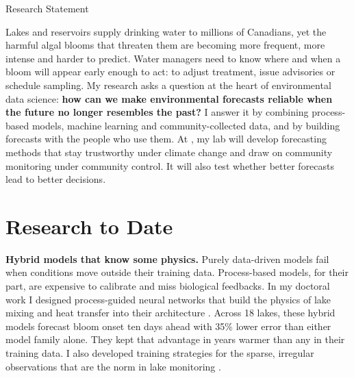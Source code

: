 \begin{applicationdocument}[
  page limit = 4,
  subtitle   = {Prepared for the position of \PositionSummary},
]{Research Statement}


Lakes and reservoirs supply drinking water to millions of Canadians, yet
the harmful algal blooms that threaten them are becoming more frequent,
more intense and harder to predict. Water managers need to know where and
when a bloom will appear early enough to act: to adjust treatment, issue
advisories or schedule sampling. My research asks a question at the heart
of environmental data science: \textbf{how can we make environmental
forecasts reliable when the future no longer resembles the past?} I answer
it by combining process-based models, machine learning and
community-collected data, and by building forecasts with the people who use
them. At \Institution, my lab will develop forecasting methods that stay
trustworthy under climate change and draw on community monitoring under
community control. It will also test whether better forecasts lead to
better decisions.

\section{Research to Date}

\textbf{Hybrid models that know some physics.} Purely data-driven models
fail when conditions move outside their training data. Process-based
models, for their part, are expensive to calibrate and miss biological feedbacks. In my
doctoral work I designed process-guided neural networks that build the
physics of lake mixing and heat transfer into their architecture
\cite{ellis2025hybrid,ellis2022physics}. Across 18 lakes, these hybrid models
forecast bloom onset ten days ahead with 35\% lower error than either model
family alone. They kept that advantage in years warmer than any in their
training data. I also developed training strategies for the sparse,
irregular observations that are the norm in lake monitoring
\cite{ellis2023sparse}.


\end{applicationdocument}
